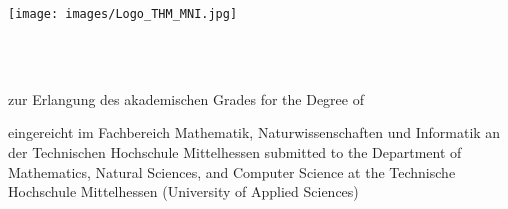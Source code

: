 
\begin{titlepage}

\begin{center}
\texttt{[image: images/Logo\_THM\_MNI.jpg]}
\par\end{center}


\noindent \begin{center}
\vspace{1cm}

\par\end{center}

\noindent \begin{center}
\textsf{\textbf{\huge \theThesis}}\textsf{}\\
\textsf{}\\
\textsf{\Large \theTitle}
\par\end{center}{\Large \par}

\vspace{1cm}


\begin{center}
{zur Erlangung des akademischen Grades}
{for the Degree of}

\par\end{center}

\begin{center}
{\textsf{\large \theAcedemicTitle}}
\par\end{center}{\large \par}

\begin{center}
{eingereicht im Fachbereich Mathematik, Naturwissenschaften und Informatik an der Technischen Hochschule Mittelhessen}
{submitted to the Department of Mathematics, Natural Sciences, and Computer Science at the Technische Hochschule Mittelhessen (University of Applied Sciences)}

{\large \vspace{1cm}
}
\par\end{center}{\large \par}


\end{titlepage}
